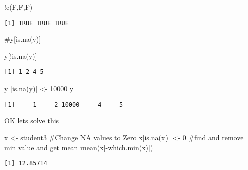 \documentclass[
  letterpaper,
  DIV=11,
  numbers=noendperiod]{scrartcl}
\newenvironment{Shaded}{\begin{snugshade}}{\end{snugshade}}
\newcommand{\CommentTok}[1]{\textcolor[rgb]{0.37,0.37,0.37}{#1}}
\newcommand{\DecValTok}[1]{\textcolor[rgb]{0.68,0.00,0.00}{#1}}
\newcommand{\FunctionTok}[1]{\textcolor[rgb]{0.28,0.35,0.67}{#1}}
\newcommand{\NormalTok}[1]{\textcolor[rgb]{0.00,0.23,0.31}{#1}}
\newcommand{\OtherTok}[1]{\textcolor[rgb]{0.00,0.23,0.31}{#1}}
\newcommand{\SpecialCharTok}[1]{\textcolor[rgb]{0.37,0.37,0.37}{#1}}
\begin{document}
\begin{Shaded}
\begin{Highlighting}[]
\SpecialCharTok{!}\FunctionTok{c}\NormalTok{(F,F,F)}
\end{Highlighting}
\end{Shaded}

\begin{verbatim}
[1] TRUE TRUE TRUE
\end{verbatim}

\begin{Shaded}
\begin{Highlighting}[]
\CommentTok{\#y[is.na(y)]}
\end{Highlighting}
\end{Shaded}

\begin{Shaded}
\begin{Highlighting}[]
\NormalTok{y[}\SpecialCharTok{!}\FunctionTok{is.na}\NormalTok{(y)]}
\end{Highlighting}
\end{Shaded}

\begin{verbatim}
[1] 1 2 4 5
\end{verbatim}

\begin{Shaded}
\begin{Highlighting}[]
\NormalTok{y [}\FunctionTok{is.na}\NormalTok{(y)] }\OtherTok{\textless{}{-}} \DecValTok{10000}
\NormalTok{y}
\end{Highlighting}
\end{Shaded}

\begin{verbatim}
[1]     1     2 10000     4     5
\end{verbatim}

OK lets solve this

\begin{Shaded}
\begin{Highlighting}[]
\NormalTok{x }\OtherTok{\textless{}{-}}\NormalTok{ student3}
\CommentTok{\#Change NA values to Zero}
\NormalTok{x[}\FunctionTok{is.na}\NormalTok{(x)] }\OtherTok{\textless{}{-}} \DecValTok{0}
\CommentTok{\#find and remove min value and get mean}
\FunctionTok{mean}\NormalTok{(x[}\SpecialCharTok{{-}}\FunctionTok{which.min}\NormalTok{(x)])}
\end{Highlighting}
\end{Shaded}

\begin{verbatim}
[1] 12.85714
\end{verbatim}
\end{document}
